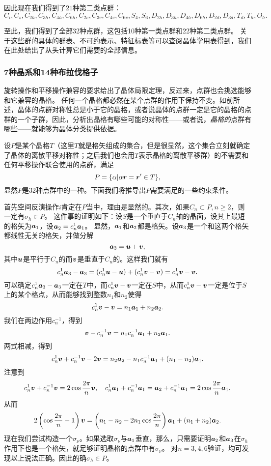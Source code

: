 因此现在我们得到了$21$种第二类点群：
\[
    C_i, C_s, C_{2h}, C_{3h}, C_{4h}, C_{6h}, C_{2v}, C_{3v}, C_{4v}, C_{6v}, S_4, S_6, D_{2h}, D_{3h}, D_{4h}, D_{6h}, D_{2d}, D_{3d}, T_d, T_h, O_h.
\]

至此，我们得到了全部32种点群，这包括10种第一类点群和22种第二类点群。
关于这些群的具体的群表、不可约表示、特征标表等可以查阅晶体学用表得到，我们在此处给出了从头计算它们需要的全部信息。

\subsubsection{7种晶系和14种布拉伐格子}\label{sec:lattice-group}

旋转操作和平移操作兼容的要求给出了晶体局限定理，反过来，点群也会挑选能够和它兼容的晶格。
任何一个晶格都必然在某个点群的作用下保持不变。如前所述，晶体的点群对称性总是小于它的晶格，或者说晶体的点群一定是它的晶格的点群的一个子群，因此，分析出晶格有哪些可能的对称性——或者说，\emph{晶格的}点群有哪些——就能够为晶体分类提供依据。

设$P$是某个晶格$T$（这里$T$就是格矢组成的集合，但是很显然，这个集合立刻就确定了晶体的离散平移对称性；之后我们也会用$T$表示晶格的离散平移群）的不需要和任何平移操作联合使用的点群，满足
\begin{equation}
    P = \{ \alpha | \alpha \vb*{r} = \vb*{r}' \in T \},
\end{equation}
显然$P$是32种点群中的一种。下面我们将推导出$P$需要满足的一些约束条件。

首先空间反演操作$i$肯定在$P$当中，理由是显然的。其次，如果$C_n \subset P, n \geq 2$，则一定有$\sigma_h \in P$。
这件事的证明如下：设$S$是一个垂直于$C_n$轴的晶面，设其上最短的格矢为$\vb*{a}_1$，设$\vb*{a}_2 = c_n^1 \vb*{a}_1$。
显然，$\vb*{a}_1$和$\vb*{a}_2$都是格矢。设$\vb*{a}_3$是一个和这两个格矢都线性无关的格矢，并做分解
\[
    \vb*{a}_3 = \vb*{u} + \vb*{v},
\]
其中$\vb*{u}$是平行于$C_n$的而$\vb*{v}$是垂直于$C_n$的。这样我们就有
\[
    c_n^1 \vb*{a}_3 - \vb*{a}_3 = (c_n^1 \vb*{u} - \vb*{u}) + (c_n^1 \vb*{v} - \vb*{v}) = c_n^1 \vb*{v} - \vb*{v} .
\]
可以确定$c_n^1 \vb*{a}_3 - \vb*{a}_3$一定在$T$中，而$c_n^1 \vb*{v} - \vb*{v}$一定在$S$中，从而$c_n^1 \vb*{v} - \vb*{v}$一定是位于$S$上的某个格点，从而能够找到整数$n_1$和$n_2$使得
\[
    c_n^1 \vb*{v} - \vb*{v} = n_1 \vb*{a}_1 + n_2 \vb*{a}_2.
\]
我们在两边作用$c_n^{-1}$，得到
\[
    \vb*{v} - c_n^{-1} \vb*{v} = n_1 c_n^{-1} \vb*{a}_1 + n_2 \vb*{a}_1.
\]
两式相减，得到
\[
    c_n^1 \vb*{v} + c_n^{-1} \vb*{v} - 2 \vb*{v} = n_2 \vb*{a}_2 - n_1 c_n^{-1} \vb*{a}_1 + (n_1 - n_2) \vb*{a}_1.
\]
注意到
\[
    c_n^1 \vb*{v} + c_n^{-1} \vb*{v} = 2 \cos\frac{2\pi}{n} \vb*{v}, \quad c_n^1 \vb*{a}_1 + c_n^{-1} \vb*{a}_1 = \vb*{a}_2 + c_n^{-1} \vb*{a}_1 = 2 \cos\frac{2\pi}{n} \vb*{a}_1,
\]
从而
\begin{equation}
    2\left( \cos\frac{2\pi}{n} - 1 \right) \vb*{v} = \left( n_1 - n_2 - 2 n_1 \cos \frac{2\pi}{n} \right) \vb*{a}_1 + (n_1 + n_2) \vb*{a}_2.
\end{equation}
现在我们尝试构造一个$\sigma_\nu$。如果选取$\sigma_\nu$与$\vb*{a}_1$垂直，那么，只需要证明$\vb*{a}_2$和$\vb*{a}_3$在$\sigma_h$作用下也是一个格矢，就足够证明晶格的点群中有$\sigma_\nu$。
对$n=3, 4, 6$验证，均可发现以上说法正确。因此的确$\sigma_h \in P$。

